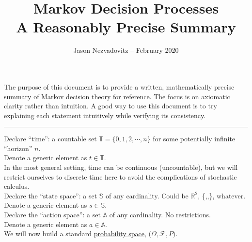 





\title{\textbf{Markov Decision Processes}\\ \large{A Reasonably Precise Summary}\vspace{-6ex}}
\author{\vspace{-5ex}}
\date{\small{Jason Nezvadovitz -- February 2020}}
\maketitle


The purpose of this document is to provide a written, mathematically precise summary of Markov decision theory for reference. The focus is on axiomatic clarity rather than intuition. A good way to use this document is to try explaining each statement intuitively while verifying its consistency.

\vspace{0.2in}
\hrule
\vspace{0.2in}

Declare ``time'': a countable set $\mathbb{T} = \{0, 1, 2, \cdots, n\}$ for some potentially infinite ``horizon'' $n$.\\
Denote a generic element as $t \in \mathbb{T}$.\\

In the most general setting, time can be continuous (uncountable), but we will restrict ourselves to discrete time here to avoid the complications of stochastic calculus.\\

Declare the ``state space'': a set $\mathbb{S}$ of any cardinality. Could be $\mathbb{R}^2$, \{\Smiley,\Cooley,\Winkey\}, whatever.\\
Denote a generic element as $s \in \mathbb{S}$.\\

Declare the ``action space'': a set $\mathbb{A}$ of any cardinality. No restrictions.\\
Denote a generic element as $a \in \mathbb{A}$.\\

We will now build a standard \href{https://en.wikipedia.org/wiki/Probability_space}{probability space}, $\boldsymbol{(}\Omega, \mathcal{F}, P\boldsymbol{)}$.\\

